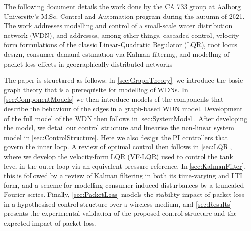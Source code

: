 The following document details the work done by the CA 733 group at Aalborg University's M.Sc. Control and Automation program during the autumn of 2021. The work addresses modelling and control of a small-scale water distribution network (WDN), and addresses, among other things, cascaded control, velocity-form formulations of the classic Linear-Quadratic Regulator (LQR), root locus design, consumer demand estimation via Kalman filtering, and modelling of packet loss effects in geographically distributed networks.

The paper is structured as follows: In \cref{sec:GraphTheory}, we introduce the basic graph theory that is a prerequisite for modelling of WDNs. In \cref{sec:ComponentModels} we then introduce models of the components that describe the behaviour of the edges in a graph-based WDN model. Development of the full model of the WDN then follows in \cref{sec:SystemModel}. After developing the model, we detail our control structure and linearise the non-linear system model in \cref{sec:ControlStructure}. Here we also design the PI controllers that govern the inner loop. A review of optimal control then follows in \cref{sec:LQR}, where we develop the velocity-form LQR (VF-LQR) used to control the tank level in the outer loop via an equivalent pressure reference. In \cref{sec:KalmanFilter}, this is followed by a review of Kalman filtering in both its time-varying and LTI form, and a scheme for modelling consumer-induced disturbances by a truncated Fourier series. Finally, \cref{sec:PacketLoss} models the stability impact of packet loss in a hypothesised control structure over a wireless medium, and \cref{sec:Results} presents the experimental validation of the proposed control structure and the expected impact of packet loss.